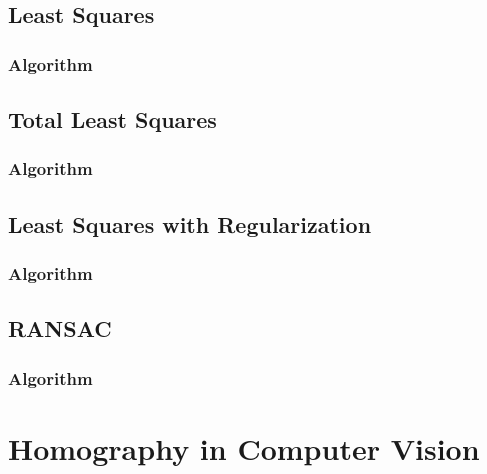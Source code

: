 \documentclass{article}
\begin{document}
\subsection{Least Squares}
\subsubsection{Algorithm}
\subsection{Total Least Squares}
\subsubsection{Algorithm}
\subsection{Least Squares with Regularization}
\subsubsection{Algorithm}
\subsection{RANSAC}
\subsubsection{Algorithm}



\section{Homography in Computer Vision}
\end{document}

